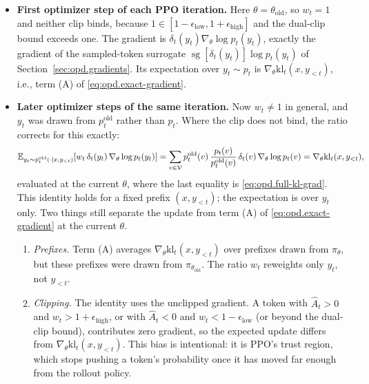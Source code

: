 \begin{itemize}
    \item \textbf{First optimizer step of each PPO iteration.} Here
    $\theta=\theta_{\mathrm{old}}$, so $w_t=1$ and neither clip binds, because
    $1\in[1-\epsilon_{\mathrm{low}},1+\epsilon_{\mathrm{high}}]$ and the dual-clip bound
    exceeds one. The gradient is $\delta_t(y_t)\nabla_\theta\log p_t(y_t)$, exactly the
    gradient of the sampled-token surrogate $\operatorname{sg}[\delta_t(y_t)]\log p_t(y_t)$ of
    Section~\ref{sec:opd.gradients}. Its expectation over $y_t\sim p_t$ is
    $\nabla_\theta\mathrm{kl}_t(x,y_{<t})$, i.e., term (A) of \eqref{eq:opd.exact-gradient}.
    \item \textbf{Later optimizer steps of the same iteration.} Now $w_t\neq 1$ in general,
    and $y_t$ was drawn from $p_t^{\mathrm{old}}$ rather than $p_t$. Where the clip does not
    bind, the ratio corrects for this exactly:
    \begin{align*}
        \mathbb{E}_{y_t\sim p_t^{\mathrm{old}}(\cdot\mid x,y_{<t})}\!\left[w_t\,\delta_t(y_t)\,\nabla_\theta\log p_t(y_t)\right]
        =
        \sum_{v\in{\cal V}}p_t^{\mathrm{old}}(v)\,\frac{p_t(v)}{p_t^{\mathrm{old}}(v)}\,
        \delta_t(v)\,\nabla_\theta\log p_t(v)
        =
        \nabla_\theta\mathrm{kl}_t(x,y_{<t}),
    \end{align*}
    evaluated at the current $\theta$, where the last equality is \eqref{eq:opd.full-kl-grad}.
    This identity holds for a fixed prefix $(x,y_{<t})$; the expectation is over $y_t$ only.
    Two things still separate the update from term (A) of \eqref{eq:opd.exact-gradient} at
    the current $\theta$.
    \begin{enumerate}
        \item \emph{Prefixes.} Term (A) averages $\nabla_\theta\mathrm{kl}_t(x,y_{<t})$ over
        prefixes drawn from $\pi_\theta$, but these prefixes were drawn from
        $\pi_{\theta_{\mathrm{old}}}$. The ratio $w_t$ reweights only $y_t$, not $y_{<t}$.
        \item \emph{Clipping.} The identity uses the unclipped gradient. A token with
        $\hat A_t>0$ and $w_t>1+\epsilon_{\mathrm{high}}$, or with $\hat A_t<0$ and
        $w_t<1-\epsilon_{\mathrm{low}}$ (or beyond the dual-clip bound), contributes zero
        gradient, so the expected update differs from $\nabla_\theta\mathrm{kl}_t(x,y_{<t})$.
        This bias is intentional: it is PPO's trust region, which stops pushing a token's
        probability once it has moved far enough from the rollout policy.
    \end{enumerate}
\end{itemize}


